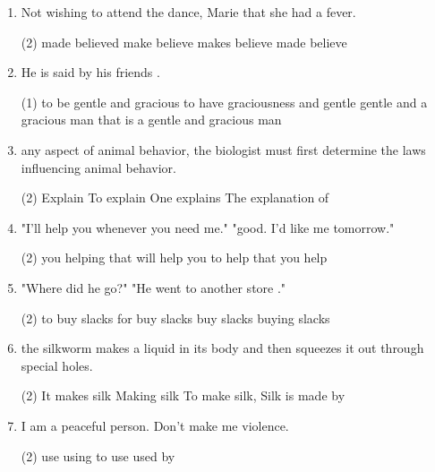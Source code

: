 \begin{enumerate}
\item Not wishing to attend the dance, Marie \ttu that she had a fever.
  \begin{tasks}(2)
    \task made believed
    \task make believe
    \task makes believe
    \task made believe
  \end{tasks}

\item He is said by his friends \ttu.
  \begin{tasks}(1)
    \task to be gentle and gracious
    \task to have graciousness and gentle
    \task gentle and a gracious man
    \task that is a gentle and gracious man
  \end{tasks}

\item \ttu any aspect of animal behavior, the biologist must first determine the laws influencing animal behavior.
  \begin{tasks}(2)
    \task Explain
    \task To explain
    \task One explains
    \task The explanation of
  \end{tasks}

\item "I'll help you whenever you need me." "good. I'd like \ttu me tomorrow."
  \begin{tasks}(2)
    \task you helping
    \task that will help
    \task you to help
    \task that you help
  \end{tasks}

\item "Where did he go?" "He went to another store \ttu ."
  \begin{tasks}(2)
    \task to buy slacks
    \task for buy slacks
    \task buy slacks
    \task buying slacks
  \end{tasks}

\item \ttu the silkworm makes a liquid in its body and then squeezes it out through special holes.
  \begin{tasks}(2)
    \task It makes silk
    \task Making silk
    \task To make silk,
    \task Silk is made by
  \end{tasks}

\item I am a peaceful person. Don't make me \ttu violence.
  \begin{tasks}(2)
    \task use
    \task using
    \task to use
    \task used by
  \end{tasks}


\end{enumerate}
